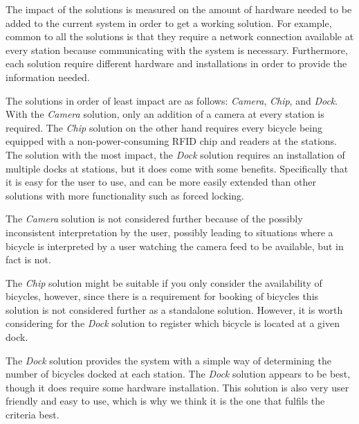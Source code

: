 The impact of the solutions is measured on the amount of hardware needed to be added to the current system in order to get a working solution. 
For example, common to all the solutions is that they require a network connection available at every station because communicating with the system is necessary. 
Furthermore, each solution require different hardware and installations in order to provide the information needed. 

The solutions in order of least impact are as follows: \textit{Camera}, \textit{Chip}, and \textit{Dock}.
With the \textit{Camera} solution, only an addition of a camera at every station is required. 
The \textit{Chip} solution on the other hand requires every bicycle being equipped with a non-power-consuming RFID chip and readers at the stations.
The solution with the most impact, the \textit{Dock} solution requires an installation of multiple docks at stations, but it does come with some benefits.
Specifically that it is easy for the user to use, and can be more easily extended than other solutions with more functionality such as forced locking.

The \textit{Camera} solution is not considered further because of the possibly inconsistent interpretation by the user, possibly leading to situations where a bicycle is interpreted by a user watching the camera feed to be available, but in fact is not.

The \textit{Chip} solution might be suitable if you only consider the availability of bicycles, however, since there is a requirement for booking of bicycles this solution is not considered further as a standalone solution.
However, it is worth considering for the \textit{Dock} solution to register which bicycle is located at a given dock.


The \textit{Dock} solution provides the system with a simple way of determining the number of bicycles docked at each station.
The \textit{Dock} solution appears to be best, though it does require some hardware installation.
This solution is also very user friendly and easy to use, which is why we think it is the one that fulfils the criteria best.